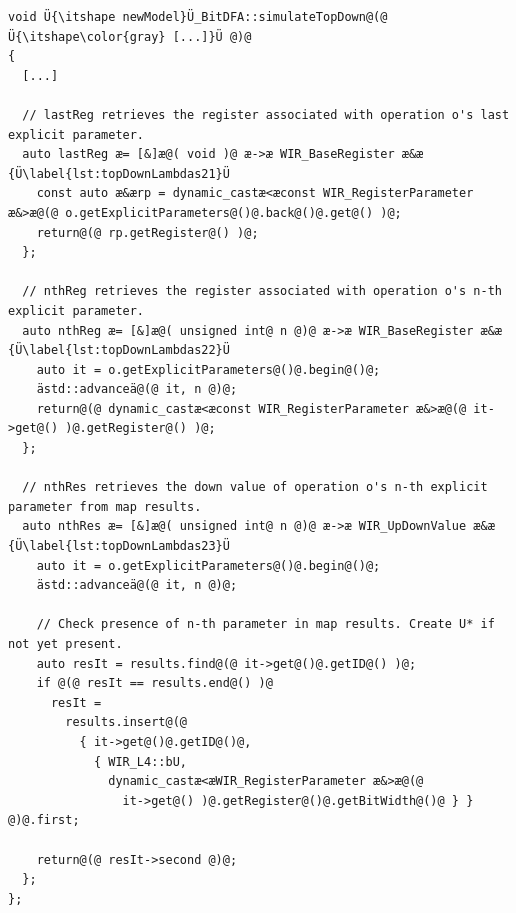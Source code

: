 \begin{lstlisting}[style=code,float=!t,caption={Definition of Lambdas for Top-Down Analysis (ctd.)},label=lst:topDownLambdas2]
void Ü{\itshape newModel}Ü_BitDFA::simulateTopDown@(@ Ü{\itshape\color{gray} [...]}Ü @)@
{
  [...]

  // lastReg retrieves the register associated with operation o's last explicit parameter.
  auto lastReg æ= [&]æ@( void )@ æ->æ WIR_BaseRegister æ&æ {Ü\label{lst:topDownLambdas21}Ü
    const auto æ&ærp = dynamic_castæ<æconst WIR_RegisterParameter æ&>æ@(@ o.getExplicitParameters@()@.back@()@.get@() )@;
    return@(@ rp.getRegister@() )@;
  };

  // nthReg retrieves the register associated with operation o's n-th explicit parameter.
  auto nthReg æ= [&]æ@( unsigned int@ n @)@ æ->æ WIR_BaseRegister æ&æ {Ü\label{lst:topDownLambdas22}Ü
    auto it = o.getExplicitParameters@()@.begin@()@;
    ästd::advanceä@(@ it, n @)@;
    return@(@ dynamic_castæ<æconst WIR_RegisterParameter æ&>æ@(@ it->get@() )@.getRegister@() )@;
  };

  // nthRes retrieves the down value of operation o's n-th explicit parameter from map results.
  auto nthRes æ= [&]æ@( unsigned int@ n @)@ æ->æ WIR_UpDownValue æ&æ {Ü\label{lst:topDownLambdas23}Ü
    auto it = o.getExplicitParameters@()@.begin@()@;
    ästd::advanceä@(@ it, n @)@;

    // Check presence of n-th parameter in map results. Create U* if not yet present.
    auto resIt = results.find@(@ it->get@()@.getID@() )@;
    if @(@ resIt == results.end@() )@
      resIt =
        results.insert@(@
          { it->get@()@.getID@()@,
            { WIR_L4::bU,
              dynamic_castæ<æWIR_RegisterParameter æ&>æ@(@
                it->get@() )@.getRegister@()@.getBitWidth@()@ } } @)@.first;

    return@(@ resIt->second @)@;
  };
};
\end{lstlisting}

